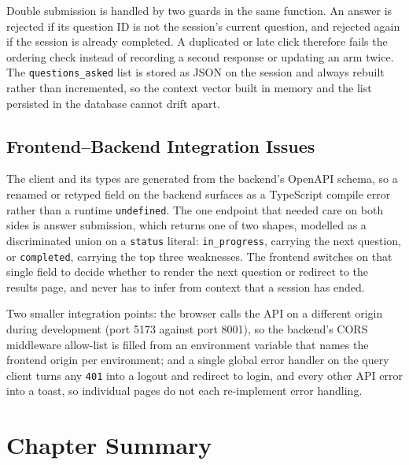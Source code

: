 \documentclass[a4paper, 12pt, oneside, openany, BCOR1cm,toc=chapterentrywithdots]{scrbook}
\begin{document}
Double submission is handled by two guards in the same function. An answer is rejected if its
question ID is not the session's current question, and rejected again if the session is already
completed. A duplicated or late click therefore fails the ordering check instead of recording a
second response or updating an arm twice. The \texttt{questions\_asked} list is stored as JSON
on the session and always rebuilt rather than incremented, so the context vector built in memory
and the list persisted in the database cannot drift apart.

\subsection{Frontend--Backend Integration Issues}

The client and its types are generated from the backend's OpenAPI schema, so a renamed or
retyped field on the backend surfaces as a TypeScript compile error rather than a runtime
\texttt{undefined}. The one endpoint that needed care on both sides is answer submission, which
returns one of two shapes, modelled as a discriminated union on a \texttt{status} literal:
\texttt{in\_progress}, carrying the next question, or \texttt{completed}, carrying the top three
weaknesses. The frontend switches on that single field to decide whether to render
the next question or redirect to the results page, and never has to infer from context that a
session has ended.

Two smaller integration points: the browser calls the API on a different origin during
development (port 5173 against port 8001), so the backend's CORS middleware allow-list is filled
from an environment variable that names the frontend origin per environment; and a single global
error handler on the query client turns any \texttt{401} into a logout and redirect to login,
and every other API error into a toast, so individual pages do not each re-implement error
handling.

\section{Chapter Summary}
\end{document}
